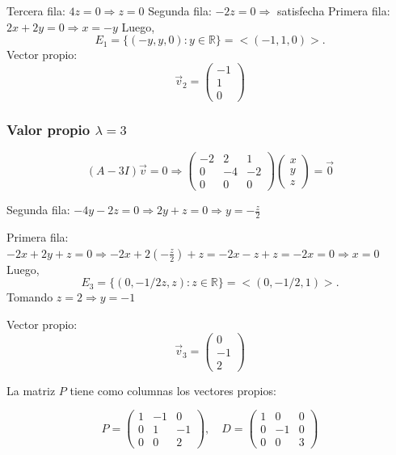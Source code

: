\documentclass[a4paper]{article}
\begin{document}
\begin{enumerate}
\begin{enumerate}
    Tercera fila: \( 4z = 0 \Rightarrow z = 0 \)  
    Segunda fila: \( -2z = 0 \Rightarrow \) satisfecha  
    Primera fila: \( 2x + 2y = 0 \Rightarrow x = -y \)
Luego,
\[E_{1}=\{(-y,y,0)\colon y\in \mathbb{R}\}=<(-1,1,0)>.\]
    Vector propio:
    \[
    \vec{v}_2 = \begin{pmatrix} -1 \\ 1 \\ 0 \end{pmatrix}
    \]

    \subsubsection*{Valor propio \( \lambda = 3 \)}

    \[
    (A - 3I)\vec{v} = 0
    \Rightarrow
    \begin{pmatrix}
    -2 & 2 & 1 \\
    0 & -4 & -2 \\
    0 & 0 & 0
    \end{pmatrix}
    \begin{pmatrix}
    x \\ y \\ z
    \end{pmatrix}
    = \vec{0}
    \]

    Segunda fila: \( -4y -2z = 0 \Rightarrow 2y + z = 0 \Rightarrow y = -\frac{z}{2} \)  
    
    Primera fila: \( -2x + 2y + z = 0 \Rightarrow -2x + 2(-\frac{z}{2}) + z = -2x - z + z = -2x = 0 \Rightarrow x = 0 \)
Luego,
\[E_{3}=\{(0,-1/2z,z)\colon z\in \mathbb{R}\}=<(0,-1/2,1)>.\]
    Tomando \( z = 2 \Rightarrow y = -1 \)

    Vector propio:
    \[
    \vec{v}_3 = \begin{pmatrix} 0 \\ -1 \\ 2 \end{pmatrix}
    \]



    La matriz \( P \) tiene como columnas los vectores propios:

    \[
    P = \begin{pmatrix}
    1 & -1 & 0 \\
    0 & 1 & -1 \\
    0 & 0 & 2
    \end{pmatrix}, \quad
    D = \begin{pmatrix}
    1 & 0 & 0 \\
    0 & -1 & 0 \\
    0 & 0 & 3
    \end{pmatrix}
    \]


\end{enumerate}
\end{enumerate}
\end{document}
